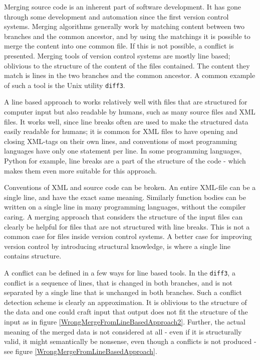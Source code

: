 \documentclass[11pt]{article}
\begin{document}
Merging source code is an inherent part of software development. It has gone through some development and automation since the first version control systems. Merging algorithms generally work by matching content between two branches and the common ancestor, and by using the matchings it is possible to merge the content into one common file. If this is not possible, a conflict is presented. Merging tools of version control systems are mostly line based; oblivious to the structure of the content of the files contained. The content they match is lines in the two branches and the common ancestor. A common example of such a tool is the Unix utility \texttt{diff3}.

A line based approach to works relatively well with files that are structured for computer input but also readable by humans, such as many source files and XML files. It works well, since line breaks often are used to make the structured data easily readable for humans; it is common for XML files to have opening and closing XML-tags on their own lines, and conventions of most programming languages have only one statement per line. In some programming languages, Python for example, line breaks are a part of the structure of the code - which makes them even more suitable for this approach.

Conventions of XML and source code can be broken. An entire XML-file can be a single line, and have the exact same meaning. Similarly function bodies can be written on a single line in many programming languages, without the compiler caring. A merging approach that considers the structure of the input files can clearly be helpful for files that are not structured with line breaks. This is not a common case for files inside version control systems. A better case for improving version control by introducing structural knowledge, is where a single line contains structure.


A conflict can be defined in a few ways for line based tools. In the \texttt{diff3}, a conflict is a sequence of lines, that is changed in both branches, and is not separated by a single line that is unchanged in both branches. Such a conflict detection scheme is clearly an approximation. It is oblivious to the structure of the data and one could craft input that output does not fit the structure of the input as in figure \ref{WrongMergeFromLineBasedApproach2}. Further, the  actual meaning of the merged data is not considered at all - even if it is structurally valid, it might semantically be nonsense, even though a conflicts is not produced - see figure \ref{WrongMergeFromLineBasedApproach}.
\end{document}
